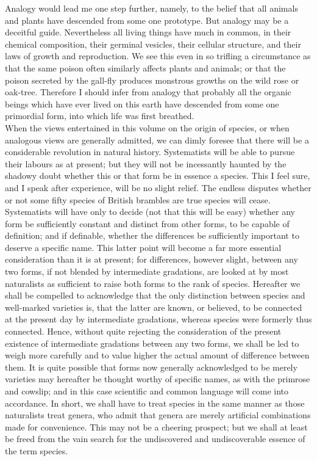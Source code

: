 \indent Analogy would lead me one step further, namely, to the belief that all animals and plants have descended from some one prototype. But analogy may be a deceitful guide.  Nevertheless all living things have much in common, in their chemical composition, their germinal vesicles, their cellular structure, and their laws of growth and reproduction. We see this even in so trifling a circumstance as that the same poison often similarly affects plants and animals; or that the poison secreted by the gall-fly produces monstrous growths on the wild rose or oak-tree. Therefore I should infer from analogy that probably all the organic beings which have ever lived on this earth have descended from some one primordial form, into which life was first breathed.~\\
\indent When the views entertained in this volume on the origin of species, or when analogous views are generally admitted, we can dimly foresee that there will be a considerable revolution in natural history. Systematists will be able to pursue their labours as at present; but they will not be incessantly haunted by the shadowy doubt whether this or that form be in essence a species. This I feel sure, and I speak after experience, will be no slight relief. The endless disputes whether or not some fifty species of British brambles are true species will cease. Systematists will have only to decide (not that this will be easy) whether any form be sufficiently constant and distinct from other forms, to be capable of definition; and if definable, whether the differences be sufficiently important to deserve a specific name. This latter point will become a far more essential consideration than it is at present; for differences, however slight, between any two forms, if not blended by intermediate gradations, are looked at by most naturalists as sufficient to raise both forms to the rank of species. Hereafter we shall be compelled to acknowledge that the only distinction between species and well-marked varieties is, that the latter are known, or believed, to be connected at the present day by intermediate gradations, whereas species were formerly thus connected. Hence, without quite rejecting the consideration of the present existence of intermediate gradations between any two forms, we shall be led to weigh more carefully and to value higher the actual amount of difference between them. It is quite possible that forms now generally acknowledged to be merely varieties may hereafter be thought worthy of specific names, as with the primrose and cowslip; and in this case scientific and common language will come into accordance. In short, we shall have to treat species in the same manner as those naturalists treat genera, who admit that genera are merely artificial combinations made for convenience. This may not be a cheering prospect; but we shall at least be freed from the vain search for the undiscovered and undiscoverable essence of the term species.~\\
